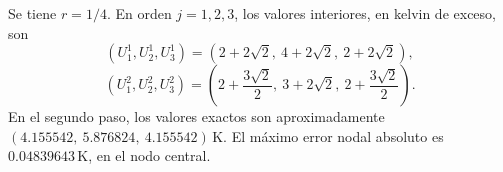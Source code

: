 Se tiene \(r=1/4\). En orden \(j=1,2,3\), los valores interiores, en kelvin de exceso, son
\[
(U_1^1,U_2^1,U_3^1)=(2+2\sqrt2,\ 4+2\sqrt2,\ 2+2\sqrt2),
\]
\[
(U_1^2,U_2^2,U_3^2)=\left(2+\frac{3\sqrt2}{2},\ 3+2\sqrt2,\ 2+\frac{3\sqrt2}{2}\right).
\]
En el segundo paso, los valores exactos son aproximadamente \((4.155542,\ 5.876824,\ 4.155542)\,\mathrm K\). El máximo error nodal absoluto es \(0.04839643\,\mathrm K\), en el nodo central.
